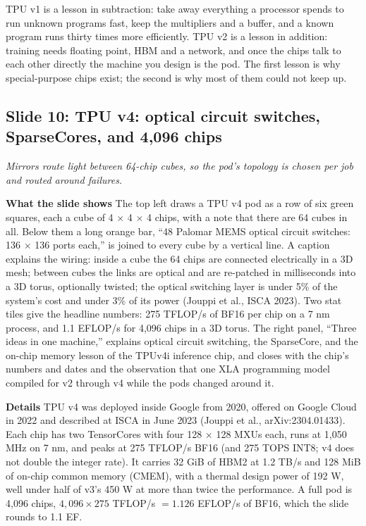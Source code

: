 \documentclass[11pt,letterpaper]{article}
\newcommand{\slide}[3]{%
  \subsection[Slide #1: #2]{Slide #1: #2}%
  {\color{muted}\itshape #3\par}\medskip}
\newcommand{\para}[1]{\medskip\noindent\textbf{#1}\quad}
\newenvironment{intuition}{\begin{tcolorbox}[intuitionbox]}{\end{tcolorbox}}
\begin{document}
\begin{intuition}
TPU v1 is a lesson in subtraction: take away everything a processor spends to run unknown programs fast, keep the multipliers and a buffer, and a known program runs thirty times more efficiently. TPU v2 is a lesson in addition: training needs floating point, HBM and a network, and once the chips talk to each other directly the machine you design is the pod. The first lesson is why special-purpose chips exist; the second is why most of them could not keep up.
\end{intuition}

\slide{10}{TPU v4: optical circuit switches, SparseCores, and 4,096 chips}{Mirrors route light between 64-chip cubes, so the pod's topology is chosen per job and routed around failures.}

\para{What the slide shows} The top left draws a TPU v4 pod as a row of six green squares, each a cube of 4 $\times$ 4 $\times$ 4 chips, with a note that there are 64 cubes in all. Below them a long orange bar, ``48 Palomar MEMS optical circuit switches: 136 $\times$ 136 ports each,'' is joined to every cube by a vertical line. A caption explains the wiring: inside a cube the 64 chips are connected electrically in a 3D mesh; between cubes the links are optical and are re-patched in milliseconds into a 3D torus, optionally twisted; the optical switching layer is under 5\% of the system's cost and under 3\% of its power (Jouppi et al., ISCA 2023). Two stat tiles give the headline numbers: 275 TFLOP/s of BF16 per chip on a 7 nm process, and 1.1 EFLOP/s for 4{,}096 chips in a 3D torus. The right panel, ``Three ideas in one machine,'' explains optical circuit switching, the SparseCore, and the on-chip memory lesson of the TPUv4i inference chip, and closes with the chip's numbers and dates and the observation that one XLA programming model compiled for v2 through v4 while the pods changed around it.

\para{Details} TPU v4 was deployed inside Google from 2020, offered on Google Cloud in 2022 and described at ISCA in June 2023 (Jouppi et al., arXiv:2304.01433). Each chip has two TensorCores with four 128 $\times$ 128 MXUs each, runs at 1{,}050 MHz on 7 nm, and peaks at 275 TFLOP/s BF16 (and 275 TOPS INT8; v4 does not double the integer rate). It carries 32 GiB of HBM2 at 1.2 TB/s and 128 MiB of on-chip common memory (CMEM), with a thermal design power of 192 W, well under half of v3's 450 W at more than twice the performance. A full pod is 4{,}096 chips, $4{,}096 \times 275$ TFLOP/s $= 1.126$ EFLOP/s of BF16, which the slide rounds to 1.1 EF.
\end{document}

